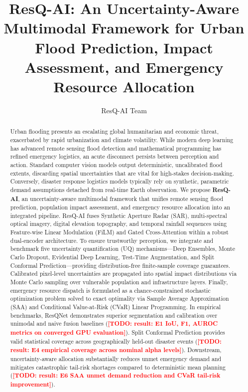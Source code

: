 \documentclass[journal]{IEEEtran}
\newcommand{\TODO}[1]{\textcolor{red}{\textbf{[TODO: #1]}}}
\begin{document}
\title{ResQ-AI: An Uncertainty-Aware Multimodal Framework for Urban Flood Prediction, Impact Assessment, and Emergency Resource Allocation}

\author{ResQ-AI Team}

\maketitle

\begin{abstract}
Urban flooding presents an escalating global humanitarian and economic threat, exacerbated by rapid urbanization and climate volatility. While modern deep learning has advanced remote sensing flood detection and mathematical programming has refined emergency logistics, an acute disconnect persists between perception and action. Standard computer vision models output deterministic, uncalibrated flood extents, discarding spatial uncertainties that are vital for high-stakes decision-making. Conversely, disaster response logistics models typically rely on synthetic, parametric demand assumptions detached from real-time Earth observation. We propose \textbf{ResQ-AI}, an uncertainty-aware multimodal framework that unifies remote sensing flood prediction, population impact assessment, and emergency resource allocation into an integrated pipeline. ResQ-AI fuses Synthetic Aperture Radar (SAR), multi-spectral optical imagery, digital elevation topography, and temporal rainfall sequences using Feature-wise Linear Modulation (FiLM) and Gated Cross-Attention within a robust dual-encoder architecture. To ensure trustworthy perception, we integrate and benchmark five uncertainty quantification (UQ) mechanisms—Deep Ensembles, Monte Carlo Dropout, Evidential Deep Learning, Test-Time Augmentation, and Split Conformal Prediction—providing distribution-free finite-sample coverage guarantees. Calibrated pixel-level uncertainties are propagated into spatial impact distributions via Monte Carlo sampling over vulnerable population and infrastructure layers. Finally, emergency resource dispatch is formulated as a chance-constrained stochastic optimization problem solved to exact optimality via Sample Average Approximation (SAA) and Conditional Value-at-Risk (CVaR) Linear Programming. In empirical benchmarks, ResQNet demonstrates superior segmentation and calibration over unimodal and naive fusion baselines (\TODO{result: E1 IoU, F1, AUROC metrics on converged GPU evaluation}). Split Conformal Prediction provides valid statistical coverage across geographically held-out disaster events (\TODO{result: E4 empirical coverage across nominal alpha levels}). Downstream, uncertainty-aware allocation substantially reduces unmet emergency demand and mitigates catastrophic tail-risk shortages compared to deterministic mean planning (\TODO{result: E6 SAA unmet demand reduction and CVaR tail-risk improvement}).
\end{abstract}
\end{document}
